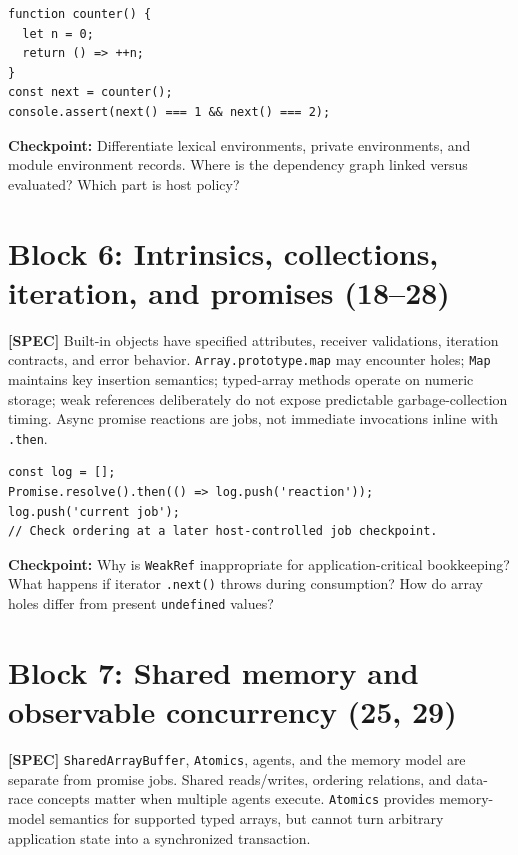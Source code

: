 \documentclass[11pt,letterpaper]{article}
\newcommand{\passthrough}[1]{#1}
\begin{document}
\begin{lstlisting}
function counter() {
  let n = 0;
  return () => ++n;
}
const next = counter();
console.assert(next() === 1 && next() === 2);
\end{lstlisting}

\textbf{Checkpoint:} Differentiate lexical environments, private environments, and module environment records. Where is the dependency graph linked versus evaluated? Which part is host policy?

\section{Block 6: Intrinsics, collections, iteration, and promises (18--28)}\label{block-6-intrinsics-collections-iteration-and-promises-1828}

\textbf{{[}SPEC{]}} Built-in objects have specified attributes, receiver validations, iteration contracts, and error behavior. \passthrough{\lstinline!Array.prototype.map!} may encounter holes; \passthrough{\lstinline!Map!} maintains key insertion semantics; typed-array methods operate on numeric storage; weak references deliberately do not expose predictable garbage-collection timing. Async promise reactions are jobs, not immediate invocations inline with \passthrough{\lstinline!.then!}.

\begin{lstlisting}
const log = [];
Promise.resolve().then(() => log.push('reaction'));
log.push('current job');
// Check ordering at a later host-controlled job checkpoint.
\end{lstlisting}

\textbf{Checkpoint:} Why is \passthrough{\lstinline!WeakRef!} inappropriate for application-critical bookkeeping? What happens if iterator \passthrough{\lstinline!.next()!} throws during consumption? How do array holes differ from present \passthrough{\lstinline!undefined!} values?

\section{Block 7: Shared memory and observable concurrency (25, 29)}\label{block-7-shared-memory-and-observable-concurrency-25-29}

\textbf{{[}SPEC{]}} \passthrough{\lstinline!SharedArrayBuffer!}, \passthrough{\lstinline!Atomics!}, agents, and the memory model are separate from promise jobs. Shared reads/writes, ordering relations, and data-race concepts matter when multiple agents execute. \passthrough{\lstinline!Atomics!} provides memory-model semantics for supported typed arrays, but cannot turn arbitrary application state into a synchronized transaction.
\end{document}
